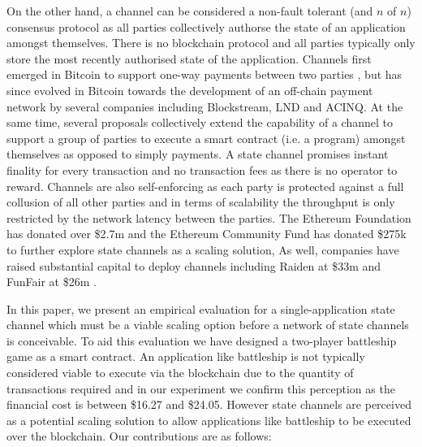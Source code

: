 \documentclass{llncs}
\begin{document}
On the other hand, a channel can be considered a non-fault tolerant (and $n$ of $n$) consensus protocol as all parties collectively authorse the state of an application amongst themselves. 
There is no blockchain protocol and all parties typically only store the most recently authorised state of the application. 
Channels first emerged in Bitcoin to support one-way payments between two parties \cite{spilman2013,decker2015fast}, but has since evolved in Bitcoin towards the development of an off-chain payment network \cite{poon2016bitcoin} by several companies including Blockstream, LND and ACINQ. 
At the same time, several proposals \cite{miller2017sprites,mccorry2018pisa,dziembowski2017perun,statechannelnetworks,coleman2018counterfactual} collectively extend the capability of a channel to support a group of parties to execute a smart contract (i.e. a program) amongst themselves as opposed to simply payments. 
A state channel promises instant finality for every transaction and no transaction fees as there is no operator to reward.
Channels are also self-enforcing as each party is protected against a full collusion of all other parties and in terms of scalability the throughput is only restricted by the network latency between the parties. 
The Ethereum Foundation has donated over \$2.7m \cite{efscaling1,efscaling2,efscaling3}  and the Ethereum Community Fund has donated \$275k \cite{ecfscaling} to further explore state channels as a scaling solution,
As well, companies have raised substantial capital to deploy channels including Raiden at \$33m \cite{raidenICO} and FunFair at \$26m \cite{funfair}.

In this paper, we present an empirical evaluation for a single-application state channel which must be a viable scaling option before a network of state channels is conceivable. 
To aid this evaluation we have designed a two-player battleship game as a smart contract.
An application like battleship is not typically considered viable to execute via the blockchain due to the quantity of transactions required and in our experiment we confirm this perception as the financial cost is between \$16.27 and \$24.05. 
However state channels are perceived as a potential scaling solution to allow applications like battleship to be executed over the blockchain. 
Our contributions are as follows: 
\end{document}
